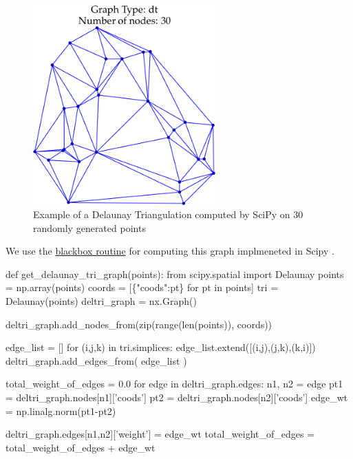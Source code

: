 \begin{figure}[ht]
  \centering
  \includegraphics[width=7cm]{./miscimages/dt-example.png}
  \caption{\label{fig:dt} Example of a Delaunay Triangulation computed by SciPy on 30 randomly generated points}
\end{figure}


We use the  \href{https://docs.scipy.org/doc/scipy/reference/generated/scipy.spatial.Delaunay.html}{blackbox routine} 
for computing this graph implmeneted in Scipy \cite{virtanen2020scipy}. 

\nwenddocs{}\plusendmoddef\nwstartdeflinemarkup{}\nwenddeflinemarkup
def get_delaunay_tri_graph(points):
     from scipy.spatial import Delaunay
     points       = np.array(points)
     coords       = [\{"coods":pt\} for pt in points]
     tri          = Delaunay(points)
     deltri_graph = nx.Graph()

     deltri_graph.add_nodes_from(zip(range(len(points)), coords))

     edge_list = []
     for (i,j,k) in tri.simplices:
         edge_list.extend([(i,j),(j,k),(k,i)])    
     deltri_graph.add_edges_from(  edge_list  )
     
     total_weight_of_edges = 0.0
     for edge in deltri_graph.edges:
           n1, n2 = edge
           pt1 = deltri_graph.nodes[n1]['coods'] 
           pt2 = deltri_graph.nodes[n2]['coods']
           edge_wt = np.linalg.norm(pt1-pt2)

           deltri_graph.edges[n1,n2]['weight'] = edge_wt
           total_weight_of_edges = total_weight_of_edges + edge_wt 
     
